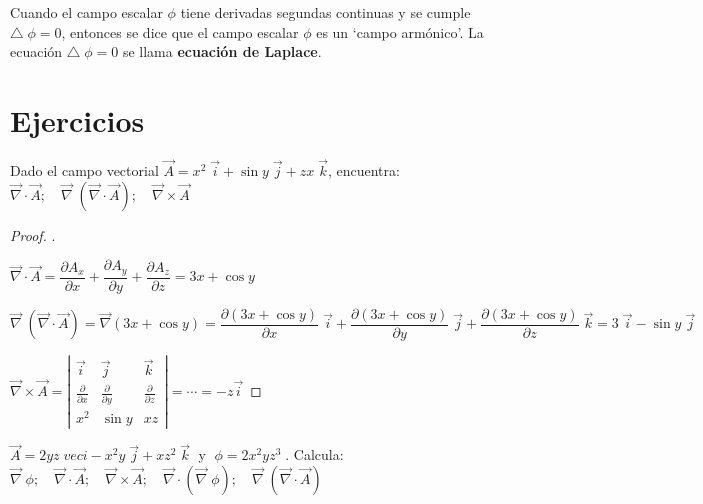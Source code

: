 Cuando el campo escalar $\phi$ tiene derivadas segundas continuas y se cumple $\triangle \; \phi = 0$, entonces se dice que el campo escalar $\phi$ es un `campo armónico'. La ecuación  $\triangle \; \phi = 0$ se llama \textbf{ecuación de Laplace}.


\section{Ejercicios}

\begin{ejre}
Dado el campo vectorial $\overrightarrow A =x^2 \; \vec i + \sin y \; \vec j + zx \; \vec k$, encuentra: $\overrightarrow {\nabla} \cdot \overrightarrow A; \quad \overrightarrow \nabla \; (\overrightarrow {\nabla} \cdot \overrightarrow A); \quad \overrightarrow {\nabla} \times \overrightarrow A$	
\end{ejre}

\vspace{3mm}\begin{proof}\renewcommand{\qedsymbol}{$\diamond$}.	 

$\overrightarrow{\nabla}\cdot \vec A = \dfrac {\partial A_x}{\partial x } + \dfrac {\partial A_y}{\partial y }+ \dfrac {\partial A_z}{\partial z } = 3x+\cos y$	

$\overrightarrow \nabla \; (\overrightarrow {\nabla} \cdot \overrightarrow A)= \overrightarrow \nabla (3x+\cos y)= \dfrac {\partial (3x+\cos y)}{\partial x}\; \vec i + \dfrac {\partial (3x+\cos y)}{\partial y}\; \vec j +\dfrac {\partial (3x+\cos y)}{\partial z}\; \vec k = 3\; \vec i - \sin y \; \vec j$

$\overrightarrow {\nabla} \times \overrightarrow A = \left|
\begin{matrix}
\vec i & \vec j	& \vec k \\
\frac {\partial}{\partial x} & \frac {\partial}{\partial y} & \frac {\partial}{\partial z} \\
x^2 & \sin y & xz
\end{matrix}  \right|=\cdots =-z \vec i$
\end{proof}

\vspace{3mm}\begin{ejre}
$\overrightarrow A=2yz\; vec i -x^2y\; \vec j +xz^2\; \vec k\; $ y $\; \phi=2x^2yz^3\; $. Calcula: $\overrightarrow \nabla \; \phi; \quad \overrightarrow \nabla \cdot \overrightarrow A; \quad \overrightarrow \nabla \times \overrightarrow A; \quad \overrightarrow \nabla \cdot (\overrightarrow \nabla \; \phi); \quad \overrightarrow \nabla \; (\overrightarrow \nabla \cdot \overrightarrow A) $	
\end{ejre}

